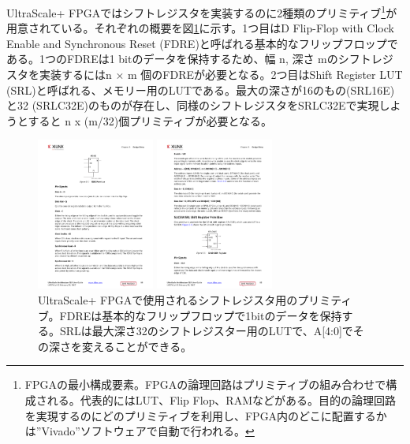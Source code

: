 UltraScale+ FPGAではシフトレジスタを実装するのに2種類のプリミティブ\footnote{FPGAの最小構成要素。FPGAの論理回路はプリミティブの組み合わせで構成される。代表的にはLUT、Flip Flop、RAMなどがある。目的の論理回路を実現するのにどのプリミティブを利用し、FPGA内のどこに配置するかは”Vivado”ソフトウェアで自動で行われる。}が用意されている。それぞれの概要を図\ref{SL_ShiftRegister}に示す。1つ目はD Flip-Flop with Clock Enable and Synchronous Reset (FDRE)と呼ばれる基本的なフリップフロップである。1つのFDREは1 bitのデータを保持するため、幅 n, 深さ mのシフトレジスタを実装するにはn $\times$ m 個のFDREが必要となる。2つ目はShift Register LUT (SRL)と呼ばれる、メモリー用のLUTである。最大の深さが16のもの(SRL16E) と32 (SRLC32E)のものが存在し、同様のシフトレジスタをSRLC32Eで実現しようとすると n x (m/32)個プリミティブが必要となる。

\begin{figure}
\begin{minipage}[b]{.5\linewidth}
\centering
\includegraphics[height=5cm]{fig/SL/FDRE.pdf}
\end{minipage}%
\begin{minipage}[b]{.5\linewidth}
\centering
\includegraphics[height=5cm]{fig/SL/SRLC32E.pdf}
\end{minipage}%
\caption[シフトレジスタを構成するプリミティブ]{UltraScale+ FPGAで使用されるシフトレジスタ用のプリミティブ\cite{UltraScale_Architecture}。FDREは基本的なフリップフロップで1bitのデータを保持する。SRLは最大深さ32のシフトレジスター用のLUTで、A[4:0]でその深さを変えることができる。}
\label{SL_ShiftRegister}
\end{figure}


